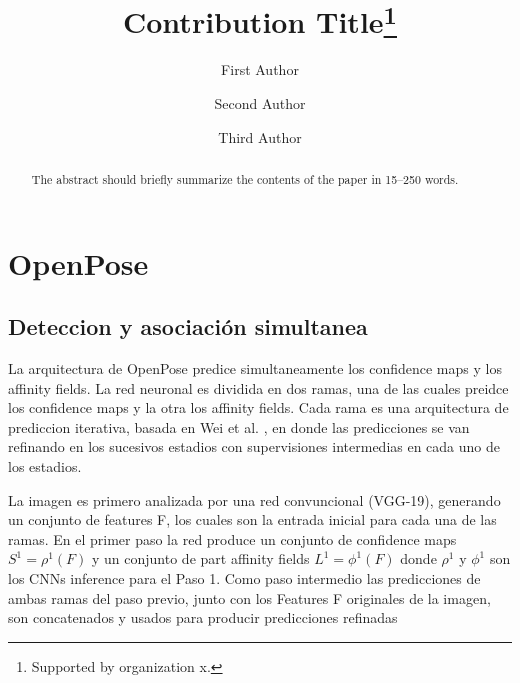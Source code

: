 \documentclass[runningheads]{llncs}
\begin{document}
%
\title{Contribution Title\thanks{Supported by organization x.}}
%
%
\author{First Author \and
Second Author \and
Third Author}
%
%
%
\maketitle              %
%
\begin{abstract}
The abstract should briefly summarize the contents of the paper in
15--250 words.

\end{abstract}
%
%
%
\section{OpenPose}
\subsection{Deteccion y asociación simultanea}
La arquitectura de OpenPose predice simultaneamente los confidence maps y los affinity fields. La red neuronal es dividida en dos ramas, una de las cuales preidce los confidence maps y la otra los affinity fields. Cada rama es una arquitectura de prediccion iterativa, basada en Wei et al. , en donde las predicciones se van refinando en los sucesivos estadios con supervisiones intermedias en cada uno de los estadios.

La imagen es primero analizada por una red convuncional (VGG-19), generando un conjunto de features F, los cuales son la entrada inicial para cada una de las ramas. En el primer paso la red produce un conjunto de confidence maps $ S^{1} = \rho^{1}(F) $ y un conjunto de part affinity fields $ L^{1} = \phi^{1}(F) $ donde $ \rho^{1} $ y $ \phi^{1} $ son los CNNs inference para el Paso 1. Como paso intermedio las predicciones de ambas ramas del paso previo, junto con los Features F originales de la imagen, son concatenados y usados para producir predicciones refinadas
\end{document}
